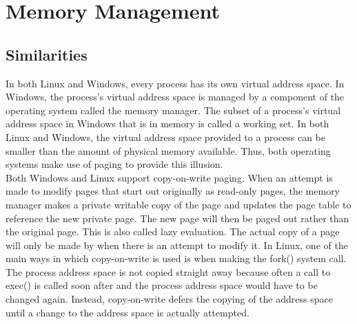 \documentclass[letterpaper,10pt,titlepage]{article}
\begin{document}
\section{Memory Management}
\subsection{Similarities}
In both Linux and Windows, every process has its own virtual address space.
In Windows, the process's virtual address space is managed by a component
of the operating system called the memory manager. The subset of a process's
virtual address space in Windows that is in memory is called a working set.
In both Linux and Windows, the virtual address space provided to a process
can be smaller than the amount of physical memory available. Thus, both 
operating systems make use of paging to provide this illusion.
\\
\linebreak
Both Windows and Linux support copy-on-write paging. When an attempt is made
to modify pages that start out originally as read-only pages, the memory 
manager makes a private writable copy of the page and updates the page table 
to reference the new private page. The new page will then be paged out rather
than the original page. This is also called lazy evaluation. The actual copy
of a page will only be made by when there is an attempt to modify it. In 
Linux, one of the main ways in which copy-on-write is used is when making the
fork() system call. The process address space is not copied straight away 
because often a call to exec() is called soon after and the process address
space would have to be changed again. Instead, copy-on-write defers the 
copying of the address space until a change to the address space is actually 
attempted.
\end{document}
